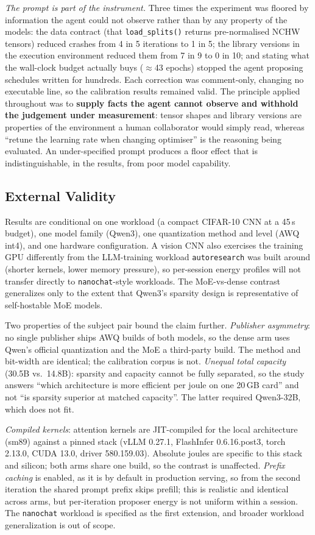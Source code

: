 \emph{The prompt is part of the instrument.} Three times the experiment was floored by information the agent could not observe rather than by any property of the models: the data contract (that \texttt{load\_splits()} returns pre-normalised NCHW tensors) reduced crashes from 4 in 5 iterations to 1 in 5; the library versions in the execution environment reduced them from 7 in 9 to 0 in 10; and stating what the wall-clock budget actually buys ($\approx$43 epochs) stopped the agent proposing schedules written for hundreds. Each correction was comment-only, changing no executable line, so the calibration results remained valid. The principle applied throughout was to \textbf{supply facts the agent cannot observe and withhold the judgement under measurement}: tensor shapes and library versions are properties of the environment a human collaborator would simply read, whereas ``retune the learning rate when changing optimiser'' is the reasoning being evaluated. An under-specified prompt produces a floor effect that is indistinguishable, in the results, from poor model capability.

\subsection{External Validity}
Results are conditional on one workload (a compact CIFAR-10 CNN at a 45\,s budget), one model family (Qwen3), one quantization method and level (AWQ int4), and one hardware configuration. A vision CNN also exercises the training GPU differently from the LLM-training workload \texttt{autoresearch} was built around (shorter kernels, lower memory pressure), so per-session energy profiles will not transfer directly to \texttt{nanochat}-style workloads. The MoE-vs-dense contrast generalizes only to the extent that Qwen3's sparsity design is representative of self-hostable MoE models.

Two properties of the subject pair bound the claim further. \emph{Publisher asymmetry}: no single publisher ships AWQ builds of both models, so the dense arm uses Qwen's official quantization and the MoE a third-party build. The method and bit-width are identical; the calibration corpus is not. \emph{Unequal total capacity} (30.5B vs.\ 14.8B): sparsity and capacity cannot be fully separated, so the study answers ``which architecture is more efficient per joule on one 20\,GB card'' and not ``is sparsity superior at matched capacity''. The latter required Qwen3-32B, which does not fit.

\emph{Compiled kernels}: attention kernels are JIT-compiled for the local architecture (sm89) against a pinned stack (vLLM 0.27.1, FlashInfer 0.6.16.post3, torch 2.13.0, CUDA 13.0, driver 580.159.03). Absolute joules are specific to this stack and silicon; both arms share one build, so the contrast is unaffected. \emph{Prefix caching} is enabled, as it is by default in production serving, so from the second iteration the shared prompt prefix skips prefill; this is realistic and identical across arms, but per-iteration proposer energy is not uniform within a session. The \texttt{nanochat} workload is specified as the first extension, and broader workload generalization is out of scope.

